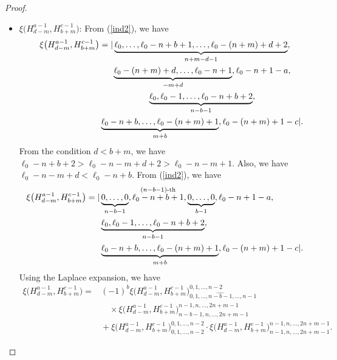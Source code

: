 \documentclass[pdftex]{sigma}
\numberwithin{equation}{section}
\begin{document}
\begin{proof}
\begin{itemize}
\item $\xi\bigl(H^{a-1}_{d-m}, H^{c-1}_{b+m}\bigr)$: From (\ref{ind2}), we have
\begin{gather*}
\xi\bigl(H^{a-1}_{d-m}, H^{c-1}_{b+m}\bigr)=|\underbrace{\ell_{0},\dots,\ell_{0}-n+b+1,\dots,\ell_0-(n+m)+d+2}_{n+m-d-1},\nonumber\\
\hphantom{\xi\bigl(H^{a-1}_{d-m}, H^{c-1}_{b+m}\bigr)=|}{}
\underbrace{\ell_{0}-(n+m)+d,\dots,\ell_{0}-n+1}_{-m+d},\ell_{0}-n+1-a,\nonumber\\
\hphantom{\xi\bigl(H^{a-1}_{d-m}, H^{c-1}_{b+m}\bigr)=|}{}
\underbrace{\ell_{0},\ell_{0}-1,\dots,\ell_{0}-n+b+2}_{n-b-1},\nonumber\\
\hphantom{\xi\bigl(H^{a-1}_{d-m}, H^{c-1}_{b+m}\bigr)=|}{}
\underbrace{\ell_{0}-n+b,\dots,\ell_{0}-(n+m)+1}_{m+b},\ell_{0}-(n+m)+1-c|.
\end{gather*}
From the condition $d<b+m$, we have $\ell_0-n+b+2>\ell_0-n-m+d+2>\ell_0-n-m+1$. Also, we have $\ell_0-n-m+d<\ell_0-n+b$. From (\ref{ind2}), we have
\begin{gather*}
\begin{split}
& \xi\bigl(H^{a-1}_{d-m}, H^{c-1}_{b+m}\bigr)=|\underbrace{0,\dots,0}_{n-b-1},\stackrel{(n-b-1)\text{-th}}{\ell_{0}-n+b+1}, \underbrace{0,\dots,0}_{b-1},\ell_{0}-n+1-a,\\
& \hphantom{\xi\bigl(H^{a-1}_{d-m}, H^{c-1}_{b+m}\bigr)=|}{}
\underbrace{\ell_{0},\ell_{0}-1,\dots,\ell_{0}-n+b+2}_{n-b-1},\\
& \hphantom{\xi\bigl(H^{a-1}_{d-m}, H^{c-1}_{b+m}\bigr)=|}{}
\underbrace{\ell_{0}-n+b,\dots,\ell_{0}-(n+m)+1}_{m+b},\ell_{0}-(n+m)+1-c|.
\end{split}
\end{gather*}
Using the Laplace expansion, we have
\begin{align*}
\xi\bigl(H^{a-1}_{d-m}, H^{c-1}_{b+m}\bigr)={}&
{(-1)}^{b}\xi\bigl(H^{a-1}_{d-m}, H^{c-1}_{b+m}\bigr)^{0,1,\dots,n-2}_{0,1,\dots,\widehat{n-b-1},\dots,n-1}\\
&\quad{}\times
 \xi\bigl(H^{a-1}_{d-m}, H^{c-1}_{b+m}\bigr)^{n-1,n,\dots,2n+m-1}_{n-b-1,n,\dots,2n+m-1}\\
&{}+\xi\bigl(H^{a-1}_{d-m}, H^{c-1}_{b+m}\bigr)^{0,1,\dots,n-2}_{0,1,\dots,n-2}\cdot\xi\bigl(H^{a-1}_{d-m}, H^{c-1}_{b+m}\bigr)^{n-1,n,\dots,2n+m-1}_{n-1,n,\dots,2n+m-1}.
\end{align*}



\end{itemize}
\end{proof}
\end{document}
